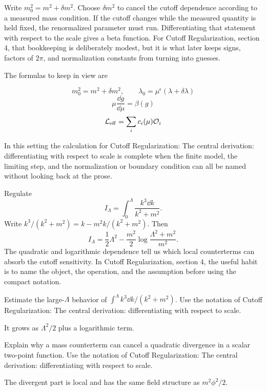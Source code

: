 Write \(m_0^2=m^2+\delta m^2\).  Choose \(\delta m^2\) to cancel the cutoff dependence according to a measured mass condition.  If the cutoff changes while the measured quantity is held fixed, the renormalized parameter must run.  Differentiating that statement with respect to the scale gives a beta function.  For Cutoff Regularization, section 4, that bookkeeping is deliberately modest, but it is what later keeps signs, factors of \(2\pi\), and normalization constants from turning into guesses.

The formulas to keep in view are

\[
  m_0^2=m^2+\delta m^2,\qquad \lambda_0=\mu^\epsilon(\lambda+\delta\lambda)
\]
\[
  \mu\frac{\dd g}{\dd\mu}=\beta(g)
\]
\[
  \mathcal L_{\mathrm{eff}}=\sum_i c_i(\mu)\mathcal O_i
\]

In this setting the calculation for Cutoff Regularization: The central derivation: differentiating with respect to scale is complete when the finite model, the limiting step, and the normalization or boundary condition can all be named without looking back at the prose.




\begin{example}
Regulate
\[
  I_\Lambda=\int_0^\Lambda\frac{k^3\dd k}{k^2+m^2}.
\]
Write \(k^3/(k^2+m^2)=k-m^2k/(k^2+m^2)\).  Then
\[
  I_\Lambda=\frac12\Lambda^2-\frac{m^2}{2}\log\frac{\Lambda^2+m^2}{m^2}.
\]
The quadratic and logarithmic dependence tell us which local counterterms can absorb the cutoff sensitivity.  In Cutoff Regularization, section 4, the useful habit is to name the object, the operation, and the assumption before using the compact notation.
\end{example}



\begin{exercise}
Estimate the large-\(\Lambda\) behavior of \(\int^\Lambda k^3\dd k/(k^2+m^2)\).  Use the notation of Cutoff Regularization: The central derivation: differentiating with respect to scale.
\begin{answer}
It grows as \(\Lambda^2/2\) plus a logarithmic term.
\end{answer}
\end{exercise}

\begin{exercise}
Explain why a mass counterterm can cancel a quadratic divergence in a scalar two-point function.  Use the notation of Cutoff Regularization: The central derivation: differentiating with respect to scale.
\begin{answer}
The divergent part is local and has the same field structure as \(m^2\phi^2/2\).
\end{answer}
\end{exercise}



